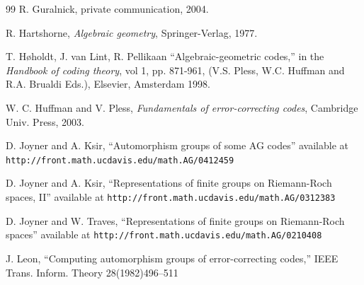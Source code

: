 \documentclass[12pt]{article}
\numberwithin{equation}{section}
\begin{document}
\begin{thebibliography}{99}
 R. Guralnick, private communication, 2004.

 R. Hartshorne, {\it Algebraic geometry},
Springer-Verlag, 1977.

T. H\o holdt, J. van Lint, R. Pellikaan
``Algebraic-geometric codes,''
in the {\it Handbook of coding theory}, vol 1, pp. 871-961,
(V.S. Pless, W.C. Huffman and R.A. Brualdi Eds.),
Elsevier, Amsterdam 1998.

 W. C. Huffman and V. Pless, 
{\it Fundamentals of 
error-correcting codes}, Cambridge Univ. Press, 2003.

 D. Joyner and A. Ksir, 
``Automorphism groups of some AG codes'' available at
\verb+http://front.math.ucdavis.edu/math.AG/0412459+

 D. Joyner and A. Ksir, 
``Representations of finite groups on Riemann-Roch
spaces, II'' available at
\verb+http://front.math.ucdavis.edu/math.AG/0312383+

 D. Joyner and W. Traves, 
``Representations of finite groups on Riemann-Roch
spaces'' available at
\verb+http://front.math.ucdavis.edu/math.AG/0210408+

%
%

 J. Leon, ``Computing automorphism 
groups of error-correcting codes,'' IEEE Trans. 
Inform. Theory 28(1982)496--511



%
%


\end{thebibliography}
\end{document}
